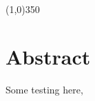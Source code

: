 \tableofcontents
\vspace{2cm}

\begin{center}
\line(1,0){350}
\end{center}

\section*{Abstract}
Some testing here, \cite{MANO:SIGGRAPHASIA:2017}
